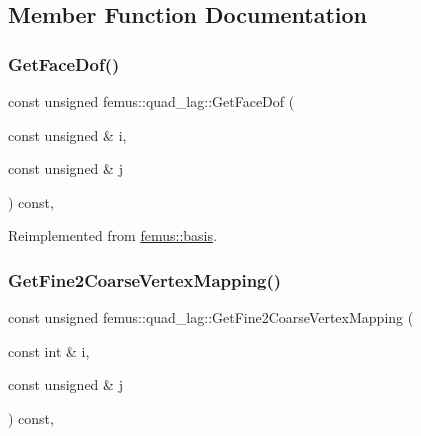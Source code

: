 \subsection{Member Function Documentation}
\mbox{\label{classfemus_1_1quad__lag_aad6a7fa04e40018089716a27d78b434e}} 
\subsubsection{\texorpdfstring{Get\+Face\+Dof()}{GetFaceDof()}}
{\footnotesize\ttfamily const unsigned femus\+::quad\+\_\+lag\+::\+Get\+Face\+Dof (\begin{DoxyParamCaption}\item[{const unsigned \&}]{i,  }\item[{const unsigned \&}]{j }\end{DoxyParamCaption}) const\hspace{0.3cm}{\ttfamily [inline]}, {\ttfamily [virtual]}}



Reimplemented from \mbox{\hyperlink{classfemus_1_1basis_a06f93864b6ce0925d41bf08173dc2500}{femus\+::basis}}.

\mbox{\label{classfemus_1_1quad__lag_a331e1c799946c87cfe43ad7c994aef1b}} 
\subsubsection{\texorpdfstring{Get\+Fine2\+Coarse\+Vertex\+Mapping()}{GetFine2CoarseVertexMapping()}}
{\footnotesize\ttfamily const unsigned femus\+::quad\+\_\+lag\+::\+Get\+Fine2\+Coarse\+Vertex\+Mapping (\begin{DoxyParamCaption}\item[{const int \&}]{i,  }\item[{const unsigned \&}]{j }\end{DoxyParamCaption}) const\hspace{0.3cm}{\ttfamily [inline]}, {\ttfamily [virtual]}}



